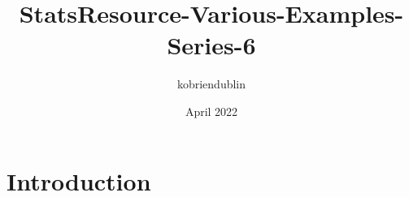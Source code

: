 \documentclass{article}
\title{StatsResource-Various-Examples-Series-6}
\author{kobriendublin }
\date{April 2022}
\begin{document}
\maketitle

\section{Introduction}
\end{document}
